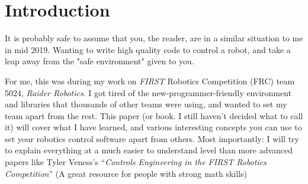 
\chapter{Introduction} %

\label{ch:introduction} %


It is probably safe to assume that you, the reader, are in a similar situation to me in mid 2019. 
Wanting to write high quality code to control a robot, and take a leap away from the "safe environment" given to you.

For me, this was during my work on \emph{FIRST} Robotics Competition (FRC) team 5024, \emph{Raider Robotics}. I got tired of 
the new-programmer-friendly environment and libraries that thousands of other teams were using, and wanted to 
set my team apart from the rest. This paper (or book. I still haven't decided what to call it) will cover 
what I have learned, and various interesting concepts you can use to set your robotics control software apart from 
others. Most importantly: I will try to explain everything at a much easier to understand level than more advanced
papers like Tyler Veness's ``\emph{Controls Engineering in the FIRST Robotics Competition}'' \citep{frccontrol}
(A great resource for people with strong math skills)